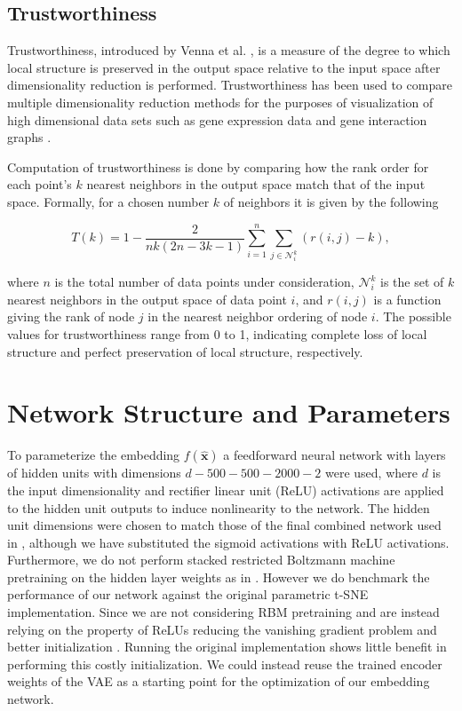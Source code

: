 \subsection{Trustworthiness}

Trustworthiness, introduced by Venna et al. \cite{trustworthiness}, is a measure of the degree to which local structure is preserved in the output space relative to the input space after dimensionality reduction is performed. Trustworthiness has been used to compare multiple dimensionality reduction methods for the purposes of visualization of high dimensional data sets such as gene expression data \cite{trustworthiness_gene_expression} and gene interaction graphs \cite{trustworthiness_gene_interaction}.

Computation of trustworthiness is done by comparing how the rank order for each point's $k$ nearest neighbors in the output space match that of the input space. Formally, for a chosen number $k$ of neighbors it is given by the following 

$$T(k) = 1 - \frac{2}{nk (2n - 3k - 1)} \sum^{n}_{i=1} \sum_{j \in \mathcal{N}_{i}^{k}} (r(i, j) - k),$$

where $n$ is the total number of data points under consideration, $\mathcal{N}_{i}^{k}$ is the set of $k$ nearest neighbors in the output space of data point $i$, and $r(i, j)$ is a function giving the rank of node $j$ in the nearest neighbor ordering of node $i$. The possible values for trustworthiness range from 0 to 1, indicating complete loss of local structure and perfect preservation of local structure, respectively.

\section{Network Structure and Parameters}
\label{section:network_structure_and_parameters}

To parameterize the embedding $f(\mathbf{\hat{x}})$ a feedforward neural network with layers of hidden units with dimensions $d - 500 - 500 - 2000 - 2$ were used, where $d$ is the input dimensionality and rectifier linear unit (ReLU) activations are applied to the hidden unit outputs to induce nonlinearity to the network. The hidden unit dimensions were chosen to match those of the final combined network used in \cite{parametric_tsne}, although we have substituted the sigmoid activations with ReLU activations. Furthermore, we do not perform stacked restricted Boltzmann machine pretraining on the hidden layer weights as in \cite{parametric_tsne}. However we do benchmark the performance of our network against the original parametric t-SNE implementation. Since we are not considering RBM pretraining and are instead relying on the property of ReLUs reducing the vanishing gradient problem \cite{relu} and better initialization \cite{xavier_initializer}. Running the original implementation shows little benefit in performing this costly initialization. We could instead reuse the trained encoder weights of the VAE as a starting point for the optimization of our embedding network.

